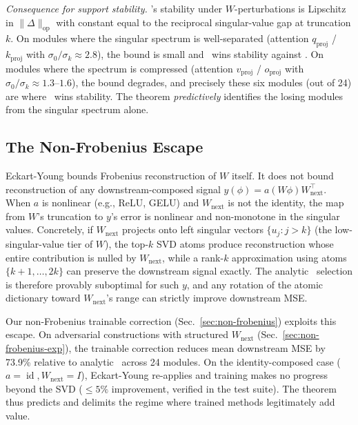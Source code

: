 \emph{Consequence for support stability.} \svdomp's stability under $W$-perturbations is Lipschitz in $\|\Delta\|_\text{op}$ with constant equal to the reciprocal singular-value gap at truncation $k$. On modules where the singular spectrum is well-separated (attention $q_\text{proj}$ / $k_\text{proj}$ with $\sigma_0 / \sigma_k \approx 2.8$), the bound is small and \svdomp\ wins stability against \vpd. On modules where the spectrum is compressed (attention $v_\text{proj}$ / $o_\text{proj}$ with $\sigma_0 / \sigma_k \approx 1.3\text{--}1.6$), the bound degrades, and precisely these six modules (out of 24) are where \vpd\ wins stability. The theorem \emph{predictively} identifies the losing modules from the singular spectrum alone.

\subsection{The Non-Frobenius Escape}

Eckart-Young bounds Frobenius reconstruction of $W$ itself. It does not bound reconstruction of any downstream-composed signal $y(\phi) = a(W \phi) W_\text{next}^\top$. When $a$ is nonlinear (e.g., ReLU, GELU) and $W_\text{next}$ is not the identity, the map from $W$'s truncation to $y$'s error is nonlinear and non-monotone in the singular values. Concretely, if $W_\text{next}$ projects onto left singular vectors $\{u_j : j > k\}$ (the low-singular-value tier of $W$), the top-$k$ SVD atoms produce reconstruction whose entire contribution is nulled by $W_\text{next}$, while a rank-$k$ approximation using atoms $\{k+1, \dots, 2k\}$ can preserve the downstream signal exactly. The analytic \svdomp\ selection is therefore provably suboptimal for such $y$, and any rotation of the atomic dictionary toward $W_\text{next}$'s range can strictly improve downstream MSE.

Our non-Frobenius trainable correction (Sec.\ \ref{sec:non-frobenius}) exploits this escape. On adversarial constructions with structured $W_\text{next}$ (Sec.\ \ref{sec:non-frobenius-exp}), the trainable correction reduces mean downstream MSE by 73.9\% relative to analytic \svdomp\ across 24 modules. On the identity-composed case ($a = \operatorname{id}, W_\text{next} = I$), Eckart-Young re-applies and training makes no progress beyond the SVD ($\leq 5\%$ improvement, verified in the test suite). The theorem thus predicts and delimits the regime where trained methods legitimately add value.
